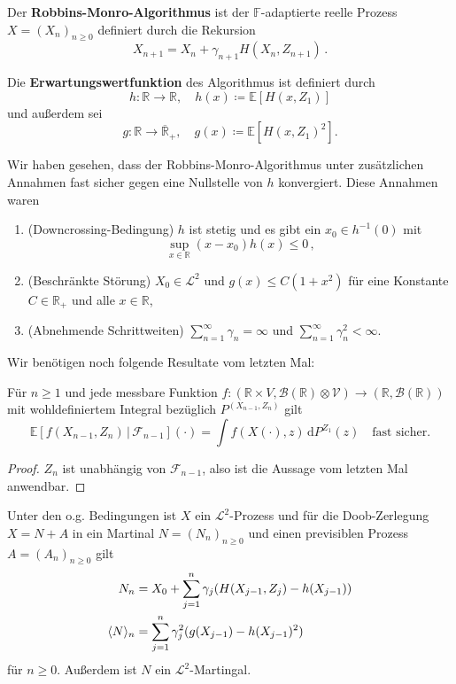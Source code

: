 \documentclass[ngerman,a4paper,11pt]{scrartcl}
\newcommand{\EE}{\mathbb{E}}
\newcommand{\FF}{\mathbb{F}}
\newcommand{\RR}{\mathbb{R}}
\newcommand{\bb}{\mathcal{B}}
\newcommand{\ff}{\mathcal{F}}
\renewcommand{\ll}{\mathcal{L}}
\newcommand{\vv}{\mathcal{V}}
\newcommand{\zspace}{V}
\newcommand{\zsigma}{\vv}
\newcommand{\interv}{\RR}
\newcommand{\expect}[1]{\EE[#1]}
\newcommand{\condexp}[2]{\EE[#1\,|\,#2]}
\newcommand{\dvar}[1]{\,\mathrm{d}#1}
\DeclarePairedDelimiter{\sprod}{\langle}{\rangle}	%
\begin{document}
Der \textbf{Robbins-Monro-Algorithmus} ist der $\FF$-adaptierte reelle Prozess
$X=(X_n)_{n\geq 0}$ definiert durch die Rekursion
\begin{equation}
  \label{eq:algo}
  X_{n+1}=X_n+\gamma_{n+1}H(X_n,Z_{n+1})\,.
\end{equation}

Die \textbf{Erwartungswertfunktion} des Algorithmus ist definiert durch
\begin{equation*}
 h:\interv\to\RR,\quad h(x)\coloneqq\expect{H(x,Z_1)}
\end{equation*}
und außerdem sei
\begin{equation*}
 g:\interv\to\overline{\RR}_+,\quad g(x)\coloneqq\expect{H(x,Z_1)^2}.
\end{equation*}

\begin{rem}
  \label{rem:11.2}
  Wir haben gesehen, dass der Robbins-Monro-Algorithmus unter zusätzlichen
  Annahmen fast sicher gegen eine Nullstelle von $h$ konvergiert. Diese Annahmen
  waren
  \begin{enumerate}[label=(\alph*)]
  \item (Downcrossing-Bedingung) $h$ ist stetig und es gibt ein $x_0\in
    h^{-1}(0)$ mit
    \begin{equation*}
      \sup_{x\in\interv}(x-x_0)h(x)\leq 0\,,
    \end{equation*}
  \item (Beschränkte Störung) $X_0\in\ll^2$ und $g(x)\leq C(1+x^2)$ für eine
    Konstante $C\in\RR_+$ und alle $x\in\interv$,\label{rem:beschr}
  \item (Abnehmende Schrittweiten) $\sum_{n=1}^\infty \gamma_n=\infty$ und
    $\sum_{n=1}^\infty\gamma_n^2<\infty$.
  \end{enumerate}
\end{rem}
Wir benötigen noch folgende Resultate vom letzten Mal:
\begin{lem}\label{lem:subst}
 Für $n\geq 1$ und jede messbare Funktion $f:(\interv\times \zspace,\bb(\interv)\otimes\zsigma)\to(\RR,\bb(\RR))$ mit
 wohldefiniertem Integral bezüglich $P^{(X_{n-1},Z_n)}$ gilt
 \begin{equation*}
  \condexp{f(X_{n-1}, Z_n)}{\ff_{n-1}}(\cdot)=\int f(X(\cdot), z)\dvar{P^{Z_1}(z)}\quad\text{fast sicher.}
 \end{equation*}
\end{lem}
\begin{proof}
 $Z_n$  ist unabhängig von $\ff_{n-1}$, also ist die Aussage vom letzten Mal anwendbar.
\end{proof}
\begin{lem}\label{lem:doob}
 Unter den o.g. Bedingungen ist $X$ ein $\ll^2$-Prozess und für die
 Doob-Zerlegung $X=N+A$ in ein Martinal $N=(N_n)_{n\geq 0}$ und einen
 previsiblen Prozess $A=(A_n)_{n\geq 0}$ gilt
 \begin{align*}
  N_n&=X_0+\sum_{j=1}^n\gamma_j(H(X_{j-1},Z_j)-h(X_{j-1})) \\
  \sprod{N}_n&=\sum_{j=1}^n\gamma_j^2(g(X_{j-1})-h(X_{j-1})^2)
 \end{align*}
 für $n\geq 0$. Außerdem ist $N$ ein $\ll^2$-Martingal.
\end{lem}
\end{document}
